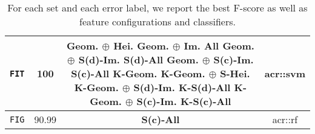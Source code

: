 \begin{table}[htpb]
\begin{tabular}{c c c c}
                \texttt{FIT} & 100 & \makecell{\textbf{Geom. \(\oplus\) Hei.}\\ \textbf{Geom. \(\oplus\) Im.}\\ \textbf{All}\\ \textbf{Geom. \(\oplus\) S(d)-Im.}\\ \textbf{S(d)-All}\\ \textbf{Geom. \(\oplus\) S(c)-Im.}\\ \textbf{S(c)-All}\\ \textbf{K-Geom.}\\ \textbf{K-Geom. \(\oplus\) S-Hei.}\\ \textbf{K-Geom. \(\oplus\) S(d)-Im.}\\ \textbf{K-S(d)-All}\\ \textbf{K-Geom. \(\oplus\) S(c)-Im.}\\ \textbf{K-S(c)-All}} & \gls{acr::svm}\\
                \midrule
                \texttt{FIG} & 90.99 & \textbf{S(c)-All} & \gls{acr::rf} \\
                \bottomrule
            \end{tabular}
            \caption{
                \label{tab::best_scat_gk_bl_svm_rf}
                For each set and each error label, we report the best F-score as well as feature configurations and classifiers.
            }
        \end{table}

        \FloatBarrier
